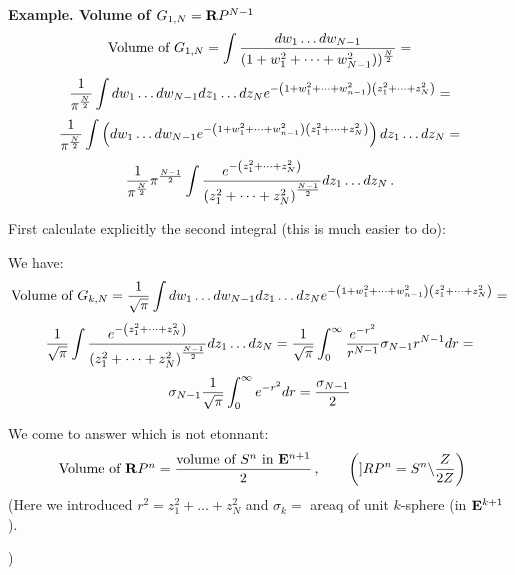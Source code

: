 {\bf Example. Volume of $G_{1,N}={\bf R} P^{N-1}$}
           $$\hbox {Volume of $G_{1,N}$}=
     \int {dw_1\dots dw_{N-1}\over 
(1+w_1^2+\dots+w_{N-1}^2))^{N\over 2}}=
       $$
         $$
    {1\over \pi^{N\over 2}}
        \int  
 dw_1\dots dw_{N-1}
   dz_1\dots dz_N
   e^{-\left(1+w_1^2+\dots+w_{n-1}^2\right)
\left(z_1^2+\dots+z_N^2\right)}=
            $$
                $$
     {1\over \pi^{N\over 2}}
        \int  
         \left(
 dw_1\dots dw_{N-1}
   e^{-\left(1+w_1^2+\dots+w_{n-1}^2\right)
\left(z_1^2+\dots+z_N^2\right)}
        \right)dz_1\dots dz_N=
           $$    $$
     {1\over \pi^{N\over 2}}
             {\pi }^{N-1\over 2}
        \int  
           {
      e^{-\left(z_1^2+\dots+z_N^2\right)}
                 \over
        \left(z_1^2+\dots+z_N^2\right)^{N-1\over 2}
              }
             dz_1\dots dz_N\,.
           $$

First calculate explicitly the second integral (this is much easier to do):

We have:
         $$\hbox {Volume of $G_{k,N}$}=
    {1\over \sqrt \pi }
        \int  
 dw_1\dots dw_{N-1}
   dz_1\dots dz_N
   e^{-\left(1+w_1^2+\dots+w_{n-1}^2\right)
\left(z_1^2+\dots+z_N^2\right)}=
            $$
               $$
     {1\over \sqrt \pi }
        \int  
           {
      e^{-\left(z_1^2+\dots+z_N^2\right)}
                 \over
        \left(z_1^2+\dots+z_N^2\right)^{N-1\over 2}
              }
             dz_1\dots dz_N=
      {1\over \sqrt \pi }
        \int_0^\infty  
           {
      e^{-r^2} 
                 \over
        r^{N-1}
              }
       \sigma_{N-1}r^{N-1}dr
             =
               $$
                 $$
     \sigma_{N-1} {1\over \sqrt \pi }
        \int_0^\infty  
      e^{-r^2} 
        dr
  = {\sigma_{N-1}\over 2}
                 $$

We come to answer which is not etonnant:
                  $$
  \hbox{ Volume of ${\bf R} P^n$}=
{\hbox {volume of $S^n$ in ${\bf E}^{n+1}$}\over 2}\,,\qquad
       \left(]RP^n=S^n\backslash {Z\over 2Z}\right)
                  $$
(Here we introduced
           $r^2=z_1^2+\dots+z_N^2$
and  $\sigma_k=$ areaq of unit $k$-sphere (in ${\bf E}^{k+1}$).

)

\medskip

